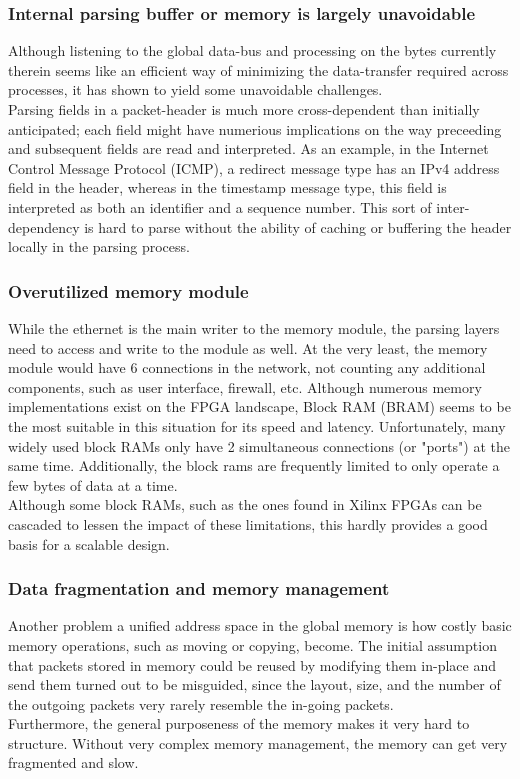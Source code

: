 \subsubsection{Internal parsing buffer or memory is largely unavoidable}
Although listening to the global data-bus and processing on the bytes currently
therein  seems like an efficient way of minimizing the data-transfer required
across processes, it has shown to yield some unavoidable challenges.\\
Parsing fields in a packet-header is much more cross-dependent than initially
anticipated; each field might have numerious implications on the way preceeding
and subsequent fields are read and interpreted. As an example, in the Internet
Control Message Protocol (ICMP), a redirect message type has an IPv4 address field in
the header, whereas in the timestamp message type, this field is interpreted as
both an identifier and a sequence number.
This sort of inter-dependency is hard to parse without the ability of caching
or buffering the header locally in the parsing process.

\subsubsection{Overutilized memory module}
While the ethernet is the main writer to the memory module, the parsing layers
need to access and write to the module as well. At the very least, the memory
module would have 6 connections in the network, not counting any additional
components, such as user interface, firewall, etc.
Although numerous memory implementations exist on the FPGA landscape, Block RAM
(BRAM) seems to be the most suitable in this situation for its speed and latency.
Unfortunately, many widely used block RAMs only have 2 simultaneous connections
(or "ports") at the same time. Additionally, the block rams are frequently
limited to only operate a few bytes of data at a time.\\
Although some block RAMs, such as the ones found in Xilinx FPGAs can be cascaded\cite{xilinx_fpga_memory_resources}
to lessen the impact of these limitations, this hardly provides a good basis for
a scalable design.

\subsubsection{Data fragmentation and memory management}
Another problem a unified address space in the global memory is how costly
basic memory operations, such as moving or copying, become. The initial
assumption that packets stored in memory could be reused by modifying them
in-place and send them turned out to be misguided, since the layout, size, and
the number of the outgoing packets very rarely resemble the in-going packets.\\
Furthermore, the general purposeness of the memory makes it very hard to
structure. Without very complex memory management, the memory can get very
fragmented and slow.


